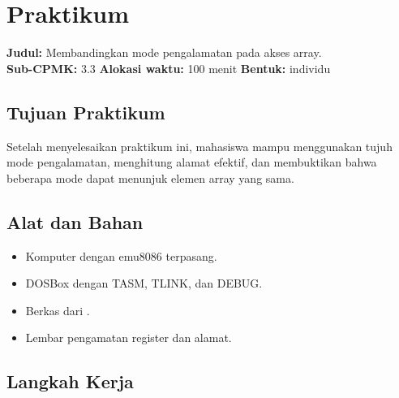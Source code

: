 \section{Praktikum}
\label{sec:praktikum-bab12}

\begin{praktikumbox}
\vspace{1.1em}
\textbf{Judul:} Membandingkan mode pengalamatan pada akses array.\\[0.3em]
\textbf{Sub-CPMK:} 3.3 \quad\textbullet\quad
\textbf{Alokasi waktu:} 100 menit \quad\textbullet\quad
\textbf{Bentuk:} individu
\end{praktikumbox}

\subsection{Tujuan Praktikum}

Setelah menyelesaikan praktikum ini, mahasiswa mampu menggunakan
tujuh mode pengalamatan, menghitung alamat efektif, dan membuktikan
bahwa beberapa mode dapat menunjuk elemen array yang sama.

\subsection{Alat dan Bahan}

\begin{itemize}
    \item Komputer dengan emu8086 terpasang.
    \item DOSBox dengan TASM, TLINK, dan DEBUG.
    \item Berkas  dari .
    \item Lembar pengamatan register dan alamat.
\end{itemize}

\subsection{Langkah Kerja}

